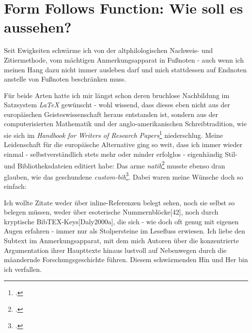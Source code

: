 %
%
%
%
\section{Form Follows Function: Wie soll es aussehen?}

Seit Ewigkeiten schwärme ich von der altphilologischen Nachweis- und
Zitiermethode, vom mächtigen Anmerkungsapparat in Fußnoten - auch wenn ich
meinen Hang dazu nicht immer ausleben darf und mich stattdessen auf Endnoten
anstelle von Fußnoten beschränken muss.

Für beide Arten hatte ich mir längst schon deren bruchlose Nachbildung im
Satzsystem \emph{LaTeX} gewünscht - wohl wissend, dass dieses eben nicht aus der
europäischen Geisteswissenschaft heraus entstanden ist, sondern aus der
computerisierten Mathematik und der anglo-amerikanischen Schreibtradition, wie
sie sich im \textit{Handbook for Writers of Research
Papers}\footcite[vgl.][]{ModLanAss2009a} niederschlug. Meine Leidenschaft für
die europäische Alternative ging so weit, dass ich immer wieder einmal -
selbstverständlich stets mehr oder minder erfolglos - eigenhändig Stil- und
Bibliotheksdateien editiert habe: Das arme
\emph{natib}\footcite[vgl.][]{Daly2000a} musste ebenso dran glauben, wie das
geschundene \emph{custom-bib}\footcite[vgl.][]{Daly2007a}. Dabei waren meine
Wünsche doch so einfach:

Ich wollte Zitate weder über inline-Referenzen belegt sehen, noch sie selbst so
belegen müssen, weder über esoterische Nummernblöcke[42], noch durch kryptische
BibTEX-Keys[Daly2000a], die sich - wie doch oft genug mit eigenen Augen erfahren
- immer nur als Stolpersteine im Lesefluss erwiesen. Ich liebe den Subtext im
Anmerkungsapparat, mit dem mich Autoren über die konzentrierte Argumentation
ihrer Haupttexte hinaus lustvoll auf Nebenwegen durch die mäandernde
Forschungsgeschichte führen. Diesem schwärmenden Hin und Her bin ich verfallen.

